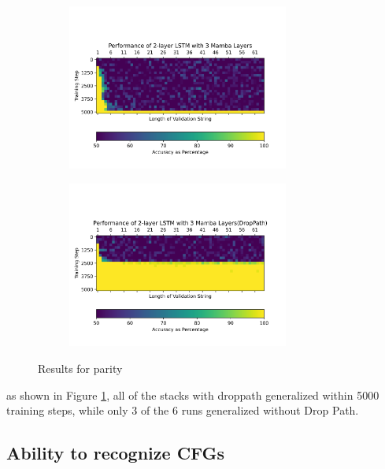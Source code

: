 \begin{figure}
\begin{subfigure}{0.5\textwidth}
\begin{center}
        \includegraphics[width=0.8\textwidth]{figures/parity_lstm_False_5_2.png.png}
        \end{center}
    \end{subfigure}\begin{subfigure}{0.5\textwidth}
        \begin{center}
        \includegraphics[width=0.8\textwidth]{figures/parity_lstm_True_5_2.png.png}
        \end{center}
    \end{subfigure}
    \caption{Results for parity}
    \label{droppathresults}
\end{figure}
as shown in Figure \ref{droppathresults}, all of the stacks with droppath
generalized within 5000 training steps, while only 3 of the 6 runs generalized
without Drop Path.

\subsection{Ability to recognize CFGs}

